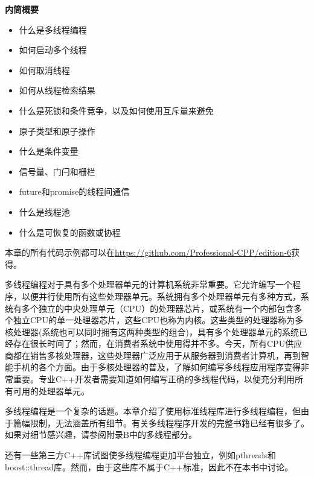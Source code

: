 \noindent
\textbf{内筒概要}

\begin{itemize}
\item
什么是多线程编程

\item
如何启动多个线程

\item
如何取消线程

\item
如何从线程检索结果

\item
什么是死锁和条件竞争，以及如何使用互斥量来避免

\item
原子类型和原子操作

\item
什么是条件变量

\item
信号量、门闩和栅栏

\item
future和promise的线程间通信

\item
什么是线程池

\item
什么是可恢复的函数或协程
\end{itemize}

本章的所有代码示例都可以在\url{https://github.com/Professional-CPP/edition-6}获得。

多线程编程对于具有多个处理器单元的计算机系统非常重要。它允许编写一个程序，以便并行使用所有这些处理器单元。系统拥有多个处理器单元有多种方式，系统有多个独立的中央处理单元（CPU）的处理器芯片，或系统有一个内部包含多个独立CPU的单一处理器芯片，这些CPU也称为内核。这些类型的处理器称为多核处理器(系统也可以同时拥有这两种类型的组合)，具有多个处理器单元的系统已经存在很长时间了；然而，在消费者系统中使用得并不多。今天，所有CPU供应商都在销售多核处理器，这些处理器广泛应用于从服务器到消费者计算机，再到智能手机的各个方面。由于多核处理器的普及，了解如何编写多线程应用程序变得非常重要。专业C++开发者需要知道如何编写正确的多线程代码，以便充分利用所有可用的处理器单元。

多线程编程是一个复杂的话题。本章介绍了使用标准线程库进行多线程编程，但由于篇幅限制，无法涵盖所有细节。有关多线程程序开发的完整书籍已经有很多了。如果对细节感兴趣，请参阅附录B中的多线程部分。

还有一些第三方C++库试图使多线程编程更加平台独立，例如pthreads和boost::thread库。然而，由于这些库不属于C++标准，因此不在本书中讨论。






